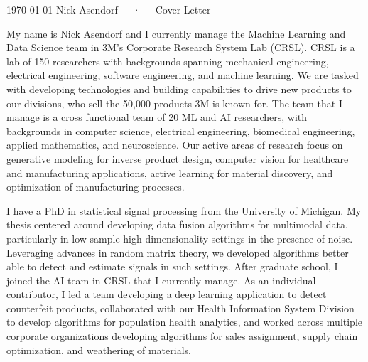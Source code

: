 \documentclass[11pt, a4paper]{awesome-cv}
\begin{document}
\makecvheader[R]

\makecvfooter
  {\today}
  {Nick Asendorf~~~·~~~Cover Letter}
  {}

\makelettertitle

\begin{cvletter}

My name is Nick Asendorf and I currently manage the Machine Learning and Data Science team
in 3M's Corporate Research System Lab (CRSL). CRSL is a lab of 150 researchers with
backgrounds spanning mechanical engineering, electrical engineering, software engineering,
and machine learning. We are tasked with developing technologies and building capabilities
to drive new products to our divisions, who sell the 50,000 products 3M is known for. The team that I manage is a cross functional team of 20 ML and AI researchers, with
backgrounds in computer science, electrical engineering, biomedical engineering, applied
mathematics, and neuroscience. Our active areas of research focus on generative modeling
for inverse product design, computer vision for healthcare and manufacturing applications,
active learning for material discovery, and optimization of manufacturing processes. 

I have a PhD in statistical signal processing from the University of Michigan. My thesis
centered around developing data fusion algorithms for multimodal data, particularly in
low-sample-high-dimensionality settings in the presence of noise. Leveraging advances in
random matrix theory, we developed algorithms better able to detect and estimate signals
in such settings. After graduate school, I joined the AI team in CRSL that I currently
manage. As an individual contributor, I led a team developing a deep learning application
to detect counterfeit products, collaborated with our Health Information System Division
to develop algorithms for population health analytics, and worked across multiple
corporate organizations developing algorithms for sales assignment, supply chain
optimization, and weathering of materials.


\end{cvletter}
\end{document}
